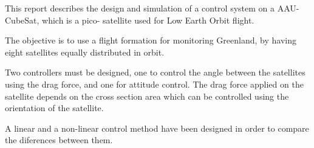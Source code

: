 This report describes the design and simulation of a control system on a AAU-CubeSat, which is a pico- satellite used for Low Earth Orbit flight.

The objective is to use a flight formation for monitoring Greenland, by having eight satellites equally distributed in orbit.

Two controllers must be designed, one to control the angle between the satellites using the drag force, and one for attitude control.  The drag force applied on the satellite depends on the cross section area which can be controlled using the orientation of the satellite.

A linear and a non-linear control method have been designed in order to compare the diferences between them.  